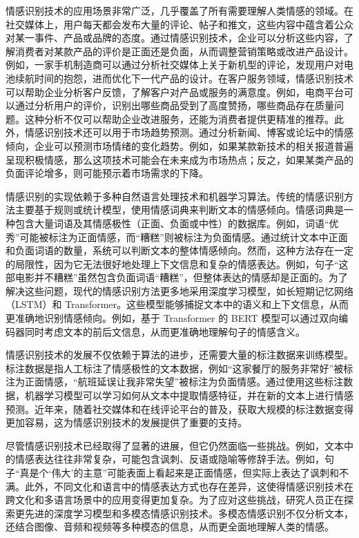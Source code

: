 情感识别技术的应用场景非常广泛，几乎覆盖了所有需要理解人类情感的领域。在社交媒体上，用户每天都会发布大量的评论、帖子和推文，这些内容中蕴含着公众对某一事件、产品或品牌的态度。通过情感识别技术，企业可以分析这些内容，了解消费者对某款产品的评价是正面还是负面，从而调整营销策略或改进产品设计。例如，一家手机制造商可以通过分析社交媒体上关于新机型的评论，发现用户对电池续航时间的抱怨，进而优化下一代产品的设计。在客户服务领域，情感识别技术可以帮助企业分析客户反馈，了解客户对产品或服务的满意度。例如，电商平台可以通过分析用户的评价，识别出哪些商品受到了高度赞扬，哪些商品存在质量问题。这种分析不仅可以帮助企业改进服务，还能为消费者提供更精准的推荐。此外，情感识别技术还可以用于市场趋势预测。通过分析新闻、博客或论坛中的情感倾向，企业可以预测市场情绪的变化趋势。例如，如果某款新技术的相关报道普遍呈现积极情感，那么这项技术可能会在未来成为市场热点；反之，如果某类产品的负面评论增多，则可能预示着市场需求的下降。

情感识别的实现依赖于多种自然语言处理技术和机器学习算法。传统的情感识别方法主要基于规则或统计模型，使用情感词典来判断文本的情感倾向。情感词典是一种包含大量词语及其情感极性（正面、负面或中性）的数据库。例如，词语“优秀”可能被标注为正面情感，而“糟糕”则被标注为负面情感。通过统计文本中正面和负面词语的数量，系统可以判断文本的整体情感倾向。然而，这种方法存在一定的局限性，因为它无法很好地处理上下文信息和复杂的情感表达。例如，句子“这部电影并不糟糕”虽然包含负面词语“糟糕”，但整体表达的情感却是正面的。为了解决这些问题，现代的情感识别方法更多地采用深度学习模型，如长短期记忆网络（LSTM）和 Transformer。这些模型能够捕捉文本中的语义和上下文信息，从而更准确地识别情感倾向。例如，基于 Transformer 的 BERT 模型可以通过双向编码器同时考虑文本的前后文信息，从而更准确地理解句子的情感含义。

情感识别技术的发展不仅依赖于算法的进步，还需要大量的标注数据来训练模型。标注数据是指人工标注了情感极性的文本数据，例如“这家餐厅的服务非常好”被标注为正面情感，“航班延误让我非常失望”被标注为负面情感。通过使用这些标注数据，机器学习模型可以学习如何从文本中提取情感特征，并在新的文本上进行情感预测。近年来，随着社交媒体和在线评论平台的普及，获取大规模的标注数据变得更加容易，这为情感识别技术的发展提供了重要的支持。

尽管情感识别技术已经取得了显著的进展，但它仍然面临一些挑战。例如，文本中的情感表达往往非常复杂，可能包含讽刺、反语或隐喻等修辞手法。例如，句子“真是个‘伟大’的主意”可能表面上看起来是正面情感，但实际上表达了讽刺和不满。此外，不同文化和语言中的情感表达方式也存在差异，这使得情感识别技术在跨文化和多语言场景中的应用变得更加复杂。为了应对这些挑战，研究人员正在探索更先进的深度学习模型和多模态情感识别技术。多模态情感识别不仅分析文本，还结合图像、音频和视频等多种模态的信息，从而更全面地理解人类的情感。

